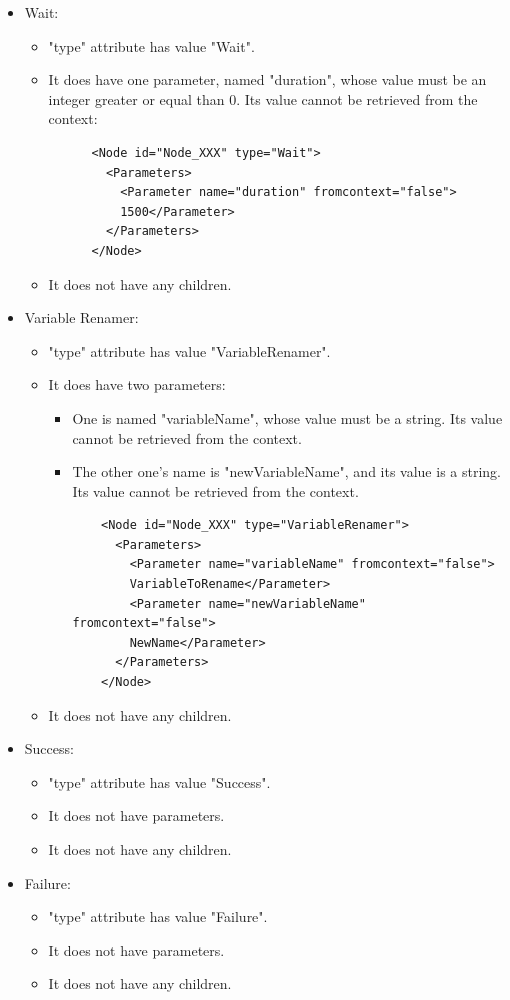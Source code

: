 \documentclass[a4paper,10pt]{article}
\begin{document}
\begin{itemize}
\item Wait:

  \begin{itemize}
  \item "type" attribute has value "Wait".
  \item It does have one parameter, named "duration", whose value must be an integer greater or equal than 0. Its value cannot be retrieved from the context:
    \begin{verbatim}
      <Node id="Node_XXX" type="Wait">
        <Parameters>
          <Parameter name="duration" fromcontext="false">
          1500</Parameter>
        </Parameters>
      </Node>
    \end{verbatim}
  \item It does not have any children.
  \end{itemize}

\item Variable Renamer:

  \begin{itemize}
  \item "type" attribute has value "VariableRenamer".
  \item It does have two parameters:
    \begin{itemize}
      \item One is named "variableName", whose value must be a string. Its value cannot be retrieved from the context.
      \item The other one's name is "newVariableName", and its value is a string. Its value cannot be retrieved from the context.
      \begin{verbatim}
    <Node id="Node_XXX" type="VariableRenamer">
      <Parameters>
        <Parameter name="variableName" fromcontext="false">
        VariableToRename</Parameter>
        <Parameter name="newVariableName" fromcontext="false">
        NewName</Parameter>
      </Parameters>
    </Node>
      \end{verbatim}
    \end{itemize}
  \item It does not have any children.
  \end{itemize}

\item Success:

  \begin{itemize}
  \item "type" attribute has value "Success".
  \item It does not have parameters.
  \item It does not have any children.
  \end{itemize}

\item Failure:

  \begin{itemize}
  \item "type" attribute has value "Failure".
  \item It does not have parameters.
  \item It does not have any children.
  \end{itemize}

\end{itemize}
\end{document}
